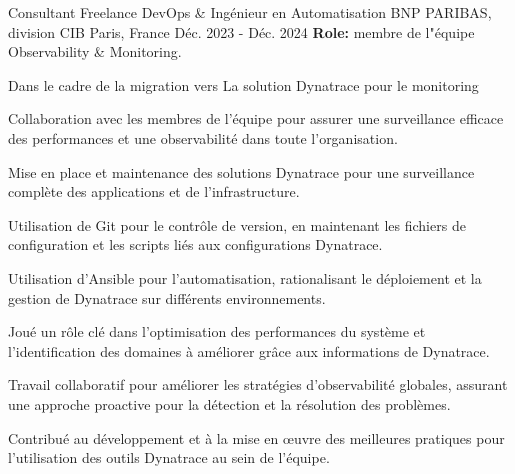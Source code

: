 
\begin{cventries}


\cventry
{Consultant Freelance DevOps \& Ingénieur en Automatisation} %
{BNP PARIBAS, division CIB} %
{Paris, France} %
{Déc. 2023 - Déc. 2024} %
{\textbf{Role:} membre de l"équipe Observability \& Monitoring.}
{
  \begin{cvitems}
    \item {Dans le cadre de la migration vers La solution Dynatrace pour le monitoring }
    \item {Collaboration avec les membres de l'équipe pour assurer une surveillance efficace des performances et une observabilité dans toute l'organisation.}
    \item {Mise en place et maintenance des solutions Dynatrace pour une surveillance complète des applications et de l'infrastructure.}
    \item {Utilisation de Git pour le contrôle de version, en maintenant les fichiers de configuration et les scripts liés aux configurations Dynatrace.}
    \item {Utilisation d'Ansible pour l'automatisation, rationalisant le déploiement et la gestion de Dynatrace sur différents environnements.}
    \item {Joué un rôle clé dans l'optimisation des performances du système et l'identification des domaines à améliorer grâce aux informations de Dynatrace.}
    \item {Travail collaboratif pour améliorer les stratégies d'observabilité globales, assurant une approche proactive pour la détection et la résolution des problèmes.}
    \item {Contribué au développement et à la mise en œuvre des meilleures pratiques pour l'utilisation des outils Dynatrace au sein de l'équipe.}
  \end{cvitems}
}


\end{cventries}
